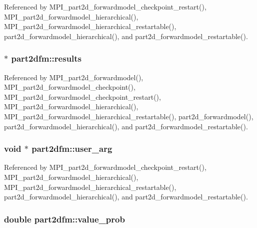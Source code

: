 Referenced by M\+P\+I\+\_\+part2d\+\_\+forwardmodel\+\_\+checkpoint\+\_\+restart(), M\+P\+I\+\_\+part2d\+\_\+forwardmodel\+\_\+hierarchical(), M\+P\+I\+\_\+part2d\+\_\+forwardmodel\+\_\+hierarchical\+\_\+restartable(), part2d\+\_\+forwardmodel\+\_\+hierarchical(), and part2d\+\_\+forwardmodel\+\_\+restartable().

\subsubsection[{\texorpdfstring{results}{results}}]{ $\ast$ part2dfm\+::results}\hypertarget{structpart2dfm_a8dbbf73b3c5e1d02ab42922c72a5f804}{}\label{structpart2dfm_a8dbbf73b3c5e1d02ab42922c72a5f804}


Referenced by M\+P\+I\+\_\+part2d\+\_\+forwardmodel(), M\+P\+I\+\_\+part2d\+\_\+forwardmodel\+\_\+checkpoint(), M\+P\+I\+\_\+part2d\+\_\+forwardmodel\+\_\+checkpoint\+\_\+restart(), M\+P\+I\+\_\+part2d\+\_\+forwardmodel\+\_\+hierarchical(), M\+P\+I\+\_\+part2d\+\_\+forwardmodel\+\_\+hierarchical\+\_\+restartable(), part2d\+\_\+forwardmodel(), part2d\+\_\+forwardmodel\+\_\+hierarchical(), and part2d\+\_\+forwardmodel\+\_\+restartable().

\subsubsection[{\texorpdfstring{user\+\_\+arg}{user_arg}}]{\setlength{\rightskip}{0pt plus 5cm}void $\ast$ part2dfm\+::user\+\_\+arg}\hypertarget{structpart2dfm_a95b6c3d5b74b4597308839c6a6ffbea9}{}\label{structpart2dfm_a95b6c3d5b74b4597308839c6a6ffbea9}


Referenced by M\+P\+I\+\_\+part2d\+\_\+forwardmodel\+\_\+checkpoint\+\_\+restart(), M\+P\+I\+\_\+part2d\+\_\+forwardmodel\+\_\+hierarchical(), M\+P\+I\+\_\+part2d\+\_\+forwardmodel\+\_\+hierarchical\+\_\+restartable(), part2d\+\_\+forwardmodel\+\_\+hierarchical(), and part2d\+\_\+forwardmodel\+\_\+restartable().

\subsubsection[{\texorpdfstring{value\+\_\+prob}{value_prob}}]{\setlength{\rightskip}{0pt plus 5cm}double part2dfm\+::value\+\_\+prob}\hypertarget{structpart2dfm_a209cacc592d391a9d18ed7efa7caaf8e}{}\label{structpart2dfm_a209cacc592d391a9d18ed7efa7caaf8e}


